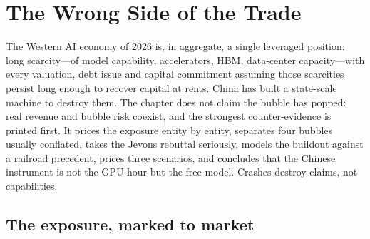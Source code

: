 \chapter{The Wrong Side of the Trade}
\label{c:trade}

\begin{glance}
The Western AI economy of 2026 is, in aggregate, a single leveraged position: long scarcity---of model capability, accelerators, HBM, data-center capacity---with every valuation, debt issue and capital commitment assuming those scarcities persist long enough to recover capital at rents. China has built a state-scale machine to destroy them. The chapter does not claim the bubble has popped: real revenue and bubble risk coexist, and the strongest counter-evidence is printed first. It prices the exposure entity by entity, separates four bubbles usually conflated, takes the Jevons rebuttal seriously, models the buildout against a railroad precedent, prices three scenarios, and concludes that the Chinese instrument is not the GPU-hour but the free model. Crashes destroy claims, not capabilities.
\end{glance}

\section{The exposure, marked to market}

